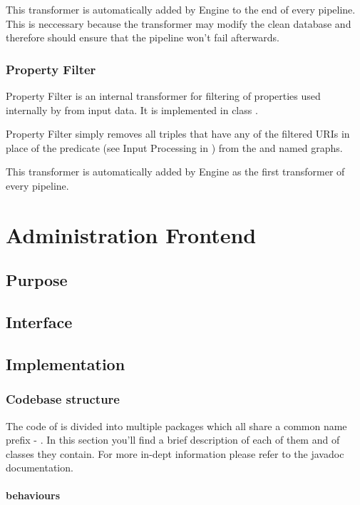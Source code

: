 This transformer is automatically added by Engine to the end of every pipeline. This is neccessary because the transformer may modify the clean database and therefore should ensure that the pipeline won't fail afterwards.

\subsection{Property Filter}
Property Filter is an internal transformer for filtering of properties used internally by \odcs from input data. It is implemented in class .

Property Filter simply removes all triples that have any of the filtered URIs in place of the predicate (see Input Processing in ) from the  and  named graphs.

This transformer is automatically added by Engine as the first transformer of every pipeline.

\chapter{Administration Frontend}
\section{Purpose}
\section{Interface}
\section{Implementation}

\subsection{Codebase structure}

The code of \FE is divided into multiple packages which all share a common name prefix - . In this section you'll find a brief description of each of them and of classes they contain. For more in-dept information please refer to the javadoc documentation.

\subsubsection{behaviours}

